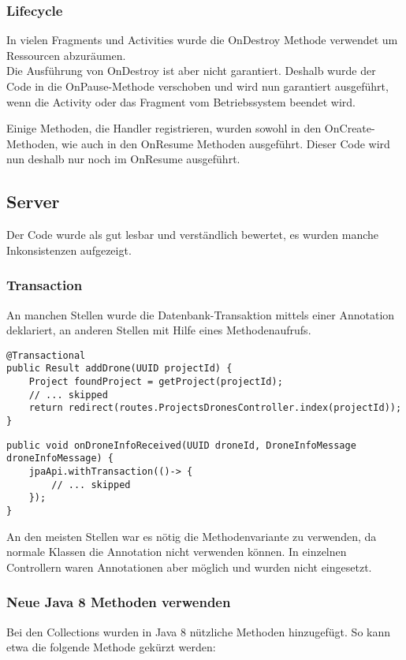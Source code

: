 \subsubsection{Lifecycle}

In vielen Fragments und Activities wurde die OnDestroy Methode verwendet um Ressourcen abzuräumen.\\
Die Ausführung von OnDestroy ist aber nicht garantiert.
Deshalb wurde der Code in die OnPause-Methode verschoben und wird nun garantiert ausgeführt, wenn die Activity oder das Fragment vom Betriebssystem beendet wird.

Einige Methoden, die Handler registrieren, wurden sowohl in den OnCreate-Methoden, wie auch in den OnResume Methoden ausgeführt. Dieser Code wird nun deshalb nur noch im OnResume ausgeführt.

\subsection{Server}

Der Code wurde als gut lesbar und verständlich bewertet, es wurden manche Inkonsistenzen aufgezeigt.

\subsubsection{Transaction}
An manchen Stellen wurde die Datenbank-Transaktion mittels einer Annotation deklariert, an anderen Stellen mit Hilfe eines Methodenaufrufs. 
\begin{lstlisting}
@Transactional
public Result addDrone(UUID projectId) {
    Project foundProject = getProject(projectId);
    // ... skipped
    return redirect(routes.ProjectsDronesController.index(projectId));
}
\end{lstlisting}

\begin{lstlisting}
public void onDroneInfoReceived(UUID droneId, DroneInfoMessage droneInfoMessage) {
    jpaApi.withTransaction(()-> {
        // ... skipped
    });
}
\end{lstlisting}

An den meisten Stellen war es nötig die Methodenvariante zu verwenden, da normale Klassen die Annotation nicht verwenden können. In einzelnen Controllern waren Annotationen aber möglich und wurden nicht eingesetzt.

\subsubsection{Neue Java 8 Methoden verwenden}
Bei den Collections wurden in Java 8 nützliche Methoden hinzugefügt. So kann etwa die folgende Methode gekürzt werden:

